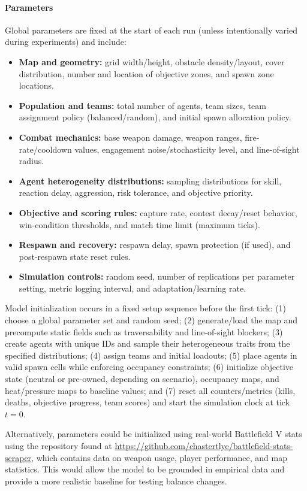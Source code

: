 \documentclass{assignment}
\begin{document}
\paragraph{Parameters}
Global parameters are fixed at the start of each run (unless intentionally varied during experiments) and include:
\begin{itemize}
    \item \textbf{Map and geometry:} grid width/height, obstacle density/layout, cover distribution, number and location of objective zones, and spawn zone locations.
    \item \textbf{Population and teams:} total number of agents, team sizes, team assignment policy (balanced/random), and initial spawn allocation policy.
    \item \textbf{Combat mechanics:} base weapon damage, weapon ranges, fire-rate/cooldown values, engagement noise/stochasticity level, and line-of-sight radius.
    \item \textbf{Agent heterogeneity distributions:} sampling distributions for skill, reaction delay, aggression, risk tolerance, and objective priority.
    \item \textbf{Objective and scoring rules:} capture rate, contest decay/reset behavior, win-condition thresholds, and match time limit (maximum ticks).
    \item \textbf{Respawn and recovery:} respawn delay, spawn protection (if used), and post-respawn state reset rules.
    \item \textbf{Simulation controls:} random seed, number of replications per parameter setting, metric logging interval, and adaptation/learning rate.
\end{itemize}

Model initialization occurs in a fixed setup sequence before the first tick: (1) choose a global parameter set and random seed; (2) generate/load the map and precompute static fields such as traversability and line-of-sight blockers; (3) create agents with unique IDs and sample their heterogeneous traits from the specified distributions; (4) assign teams and initial loadouts; (5) place agents in valid spawn cells while enforcing occupancy constraints; (6) initialize objective state (neutral or pre-owned, depending on scenario), occupancy maps, and heat/pressure maps to baseline values; and (7) reset all counters/metrics (kills, deaths, objective progress, team scores) and start the simulation clock at tick $t=0$.

Alternatively, parameters could be initialized using real-world Battlefield V stats using the repository found at \url{https://github.com/chastertlye/battlefield-stats-scraper}, which contains data on weapon usage, player performance, and map statistics. This would allow the model to be grounded in empirical data and provide a more realistic baseline for testing balance changes.
\end{document}
